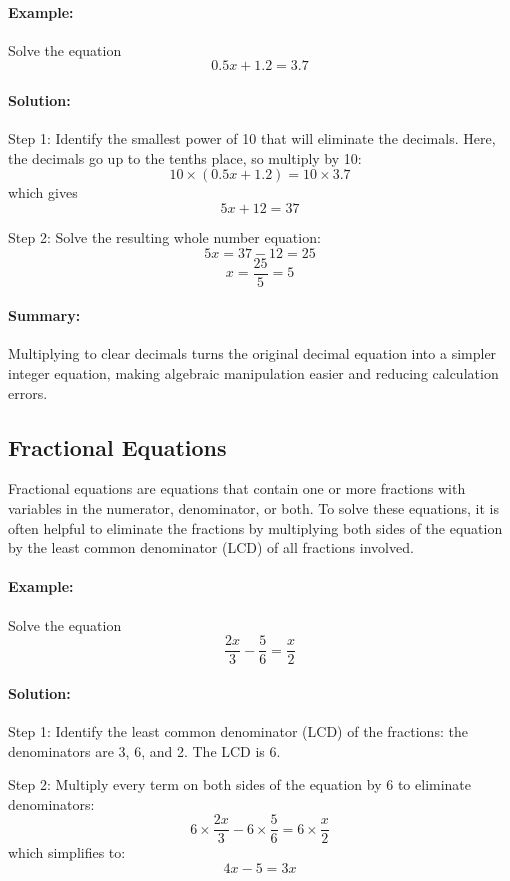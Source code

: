 \documentclass[11pt]{article}
\begin{document}
\paragraph{Example:} Solve the equation
\[
0.5x + 1.2 = 3.7
\]

\paragraph{Solution:}
Step 1: Identify the smallest power of 10 that will eliminate the decimals. Here, the decimals go up to the tenths place, so multiply by 10:
\[
10 \times (0.5x + 1.2) = 10 \times 3.7
\]
which gives
\[
5x + 12 = 37
\]

Step 2: Solve the resulting whole number equation:
\[
5x = 37 - 12 = 25
\]
\[
x = \frac{25}{5} = 5
\]

\paragraph{Summary:} Multiplying to clear decimals turns the original decimal equation into a simpler integer equation, making algebraic manipulation easier and reducing calculation errors.

\subsection{Fractional Equations}

Fractional equations are equations that contain one or more fractions with variables in the numerator, denominator, or both. To solve these equations, it is often helpful to eliminate the fractions by multiplying both sides of the equation by the least common denominator (LCD) of all fractions involved.

\paragraph{Example:} Solve the equation
\[
\frac{2x}{3} - \frac{5}{6} = \frac{x}{2}
\]

\paragraph{Solution:}

Step 1: Identify the least common denominator (LCD) of the fractions: the denominators are 3, 6, and 2. The LCD is 6.

Step 2: Multiply every term on both sides of the equation by 6 to eliminate denominators:
\[
6 \times \frac{2x}{3} - 6 \times \frac{5}{6} = 6 \times \frac{x}{2}
\]
which simplifies to:
\[
4x - 5 = 3x
\]
\end{document}
